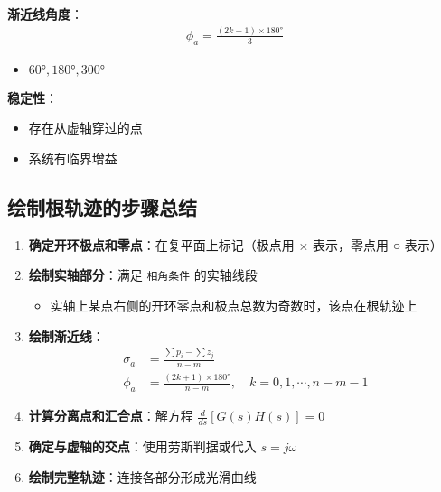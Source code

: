 \begin{tcolorbox}[colback=green!5!white,colframe=green!75!black,title=例2：三阶系统,boxsep=5pt,left=5pt,right=5pt,top=5pt,bottom=5pt]
\begin{minipage}[t]{0.45\textwidth}
\textbf{渐近线角度}：
\begin{align*}
\phi_a = \frac{(2k+1) \times 180°}{3}
\end{align*}
\begin{itemize}
    \item $60°, 180°, 300°$
\end{itemize}

\textbf{稳定性}：
\begin{itemize}
    \item 存在从虚轴穿过的点
    \item 系统有临界增益
\end{itemize}

\end{minipage}

\end{tcolorbox}

\subsection{绘制根轨迹的步骤总结}

\begin{enumerate}
    \item \textbf{确定开环极点和零点}：在复平面上标记（极点用 × 表示，零点用 ○ 表示）
    
    \item \textbf{绘制实轴部分}：满足 \texttt{相角条件} 的实轴线段
    \begin{itemize}
        \item 实轴上某点右侧的开环零点和极点总数为奇数时，该点在根轨迹上
    \end{itemize}
    
    \item \textbf{绘制渐近线}：
    \begin{align*}
    \sigma_a &= \frac{\sum p_i - \sum z_j}{n-m} \\
    \phi_a &= \frac{(2k+1) \times 180°}{n-m}, \quad k=0,1,\cdots,n-m-1
    \end{align*}
    
    \item \textbf{计算分离点和汇合点}：解方程 $\frac{d}{ds}[G(s)H(s)] = 0$
    
    \item \textbf{确定与虚轴的交点}：使用劳斯判据或代入 $s=j\omega$
    
    \item \textbf{绘制完整轨迹}：连接各部分形成光滑曲线
\end{enumerate}
